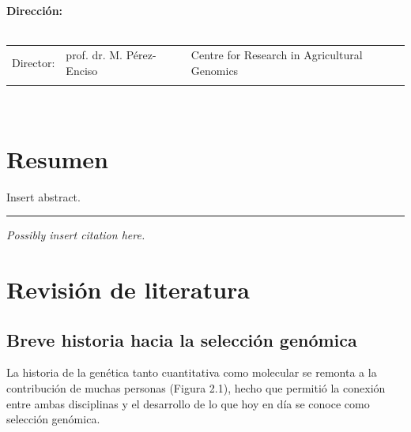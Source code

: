 \documentclass[11pt,spanish,a4paper,oneside,]{book} %
\begin{document}
\clearpage
\thispagestyle{empty}
\noindent\textbf{Dirección:}\\
\\
\noindent\begin{tabular}{@{}lll}

Director:
&  prof. dr. M. Pérez-Enciso & Centre for Research in Agricultural Genomics\\

\\
\end{tabular}\\



{
\hypersetup{linkcolor=black}
\setcounter{tocdepth}{1}
\tableofcontents
}
\mainmatter
\hypertarget{resumen}{%
\chapter{Resumen}\label{resumen}}

\noindent 
Insert abstract.

\begin{center}\rule{0.5\linewidth}{0.5pt}\end{center}

\vspace*{\fill}

\noindent
\emph{Possibly insert citation here.}
\newpage

\hypertarget{revisiuxf3n-de-literatura}{%
\chapter{Revisión de literatura}\label{revisiuxf3n-de-literatura}}

\hypertarget{breve-historia-hacia-la-selecciuxf3n-genuxf3mica}{%
\section{Breve historia hacia la selección genómica}\label{breve-historia-hacia-la-selecciuxf3n-genuxf3mica}}

La historia de la genética tanto cuantitativa como molecular se remonta a la contribución de muchas personas (Figura 2.1), hecho que permitió la conexión entre ambas disciplinas y el desarrollo de lo que hoy en día se conoce como selección genómica.
\end{document}
